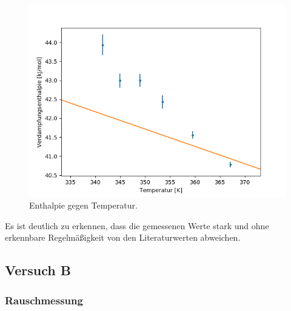 \documentclass[12pt,a4paper]{article}
\begin{document}
\begin{figure}
\begin{center}
\includegraphics[width=\linewidth]{Bilder/Enthalpie_gegen_TempA}
\caption{Enthalpie gegen Temperatur.}
\label{fig:EntTempA}
\end{center}
\end{figure}

Es ist deutlich zu erkennen, dass die gemessenen Werte stark und ohne erkennbare Regelmäßigkeit von den Literaturwerten abweichen. 


\subsection{Versuch B}


\subsubsection{Rauschmessung}
\end{document}
